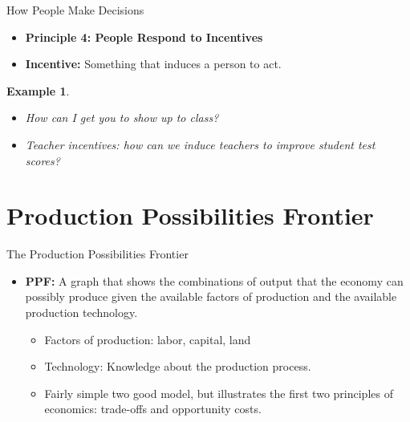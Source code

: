 \documentclass[xcolor={dvipsnames},pdf, hyperref={colorlinks=true, citecolor=ForestGreen, linkcolor=BlueViolet, urlcolor=Magenta}]{beamer}
\newtheorem{exmp}{Example}[section]
\newcommand{\defn}[1]{\textbf{#1}}
\newcommand{\ddp}[1]{{\textcolor{ForestGreen}{#1}}}
\begin{document}
\begin{frame}{How People Make Decisions}
	\begin{itemize}
	
	\item	\textbf{Principle 4: People Respond to Incentives}
	
		
	\item	\defn{Incentive:} Something that induces a person to act.
	
	\end{itemize}	
		
		\begin{exmp}
		\begin{itemize}
			\item How can I get you to show up to class? 
			\item Teacher incentives: how can we induce teachers to improve student test scores?
		\end{itemize}
		\end{exmp} 
		\pause \ddp{(i) Attendance grade, giving pop quizzes, etc.\\
		(ii) We can increase the opportunity cost of shirking by tying pay to student test scores, year-to-year progress, etc. Negative side effects: teaching to the test, cheating, etc.}
\end{frame}

\section{Production Possibilities Frontier}

\begin{frame}{The Production Possibilities Frontier}
\begin{itemize}
\item 	\defn{PPF:} A graph that shows the combinations of output that the economy can possibly produce given the available factors of production and the available production technology. 
	\begin{itemize}
		\item Factors of production: labor, capital, land
		\item Technology: Knowledge about the production process.
		\item Fairly simple two good model, but illustrates the first two principles of economics: trade-offs and opportunity costs.
	\end{itemize}
\end{itemize}
\end{frame}
\end{document}
